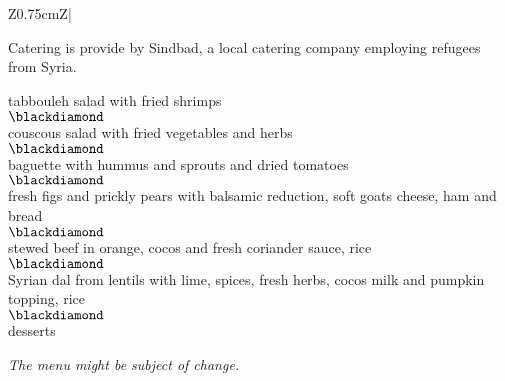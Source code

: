 \begin{landscape}
\begin{center}
\begin{tabular}{Z{0.75cm}Z{\socialEventBoxWidth}|}
\begin{minipage}[t]{\socialEventBoxWidth}
\begin{minipage}[t]{0.47\linewidth}
          \vspace{\baselineskip}
          Catering is provide by Sindbad, a local catering company employing refugees from Syria.
        \end{minipage}
        \hfill
        \noindent\begin{minipage}[t]{0.47\linewidth}
          \begin{center}
            \noindent tabbouleh salad with fried shrimps\\
            $\blackdiamond$\\
            couscous salad with fried vegetables and herbs\\
            $\blackdiamond$\\
            baguette with hummus and sprouts and dried tomatoes\\
            $\blackdiamond$\\
            fresh figs and prickly pears with balsamic reduction, soft goats cheese, ham and bread\\
            $\blackdiamond$\\
            stewed beef in orange, cocos and fresh coriander sauce, rice\\
            $\blackdiamond$\\
            Syrian dal from lentils with lime, spices, fresh herbs, cocos milk and pumpkin topping, rice\\
            $\blackdiamond$\\
            desserts

            \noindent \emph{The menu might be subject of change.}
          \end{center}
        \end{minipage}
      \end{minipage}
      \vspace{0.4\multicolsep}
      \tabularnewline
    \end{tabular}
  \end{center}
  \newpage
\end{landscape}
\renewcommand{\arraystretch}{1.0}
